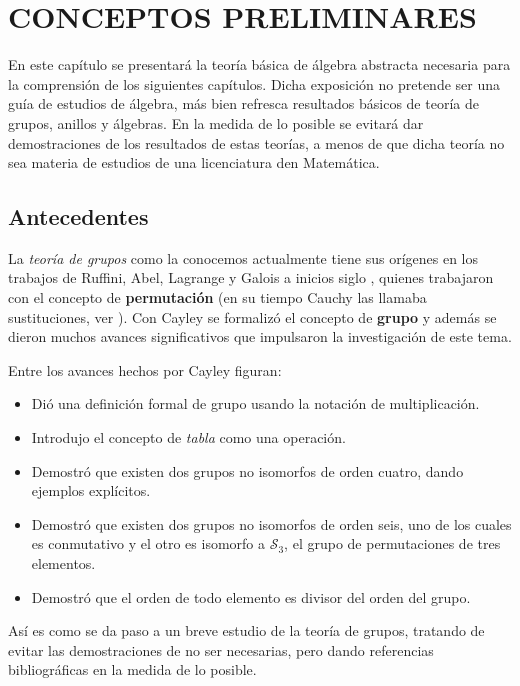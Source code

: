 \chapter{CONCEPTOS PRELIMINARES}
En este capítulo se presentará la teoría básica de álgebra abstracta necesaria para la comprensión de los siguientes capítulos. Dicha exposición no pretende ser una guía de estudios de álgebra, más bien refresca resultados básicos de teoría de grupos, anillos y álgebras. En la medida de lo posible se evitará dar demostraciones de los resultados de estas teorías, a menos de que dicha teoría no sea materia de estudios de una licenciatura den Matemática.
\section{Antecedentes}
La \textit{teoría de grupos} como la conocemos actualmente tiene sus orígenes en los trabajos de Ruffini, Abel, Lagrange y Galois a inicios siglo , quienes trabajaron con el concepto de \textbf{permutación} (en su tiempo Cauchy las llamaba \textsf{sustituciones}, ver \cite[página 104]{bib:libroGuti}). Con Cayley \cite[página 104]{bib:libroLosGrandes} se formalizó el concepto de \textbf{grupo} y además se dieron muchos avances significativos que impulsaron la investigación de este tema. 

Entre los avances hechos por Cayley figuran:
\begin{itemize}
\item Dió una definición formal de grupo usando la notación de multiplicación.
\item Introdujo el concepto de \textit{tabla} como una operación.
\item Demostró que existen dos grupos no isomorfos de orden cuatro, dando ejemplos explícitos. 
\item Demostró que existen dos grupos no isomorfos de orden seis, uno de los cuales es conmutativo y el otro es isomorfo a $\mathcal{S}_3$, el grupo de permutaciones de tres elementos.
\item Demostró que el orden de todo elemento es divisor del orden del grupo. 
\end{itemize}
Así es como se da paso a un breve estudio de la teoría de grupos, tratando de evitar las demostraciones de no ser necesarias, pero dando referencias bibliográficas en la medida de lo posible. 
